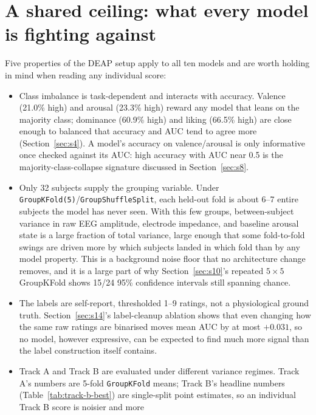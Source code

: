 \documentclass[11pt]{report}
\begin{document}
\section{A shared ceiling: what every model is fighting against}
\label{sec:ma-shared}
Five properties of the DEAP setup apply to all ten models and are worth
holding in mind when reading any individual score:
\begin{itemize}
  \item Class imbalance is task-dependent and interacts with accuracy.
        Valence (21.0\% high) and arousal (23.3\% high) reward any model
        that leans on the majority class; dominance (60.9\% high) and
        liking (66.5\% high) are close enough to balanced that accuracy and
        AUC tend to agree more (Section~\ref{sec:s4}). A model's accuracy on
        valence/arousal is only informative once checked against its AUC:
        high accuracy with AUC near 0.5 is the majority-class-collapse
        signature discussed in Section~\ref{sec:s8}.
  \item Only 32 subjects supply the grouping variable. Under
        \texttt{GroupKFold(5)}/\texttt{GroupShuffleSplit}, each held-out
        fold is about 6--7 entire subjects the model has never seen. With
        this few groups, between-subject variance in raw EEG amplitude,
        electrode impedance, and baseline arousal state is a large fraction
        of total variance, large enough that some fold-to-fold swings are
        driven more by which subjects landed in which fold than by any
        model property. This is a background noise floor that no
        architecture change removes, and it is a large part of why
        Section~\ref{sec:s10}'s repeated $5\times5$ GroupKFold shows 15/24
        95\% confidence intervals still spanning chance.
  \item The labels are self-report, thresholded 1--9 ratings, not a
        physiological ground truth. Section~\ref{sec:s14}'s label-cleanup
        ablation shows that even changing how the same raw ratings are
        binarised moves mean AUC by at most $+0.031$, so no model, however
        expressive, can be expected to find much more signal than the label
        construction itself contains.
  \item Track A and Track B are evaluated under different variance regimes.
        Track A's numbers are 5-fold \texttt{GroupKFold} means; Track B's
        headline numbers (Table~\ref{tab:track-b-best}) are single-split
        point estimates, so an individual Track B score is noisier and more

\end{itemize}
\end{document}
